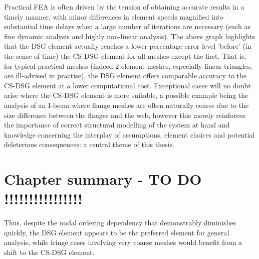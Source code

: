 Practical FEA is often driven by the tension of obtaining accurate results in a timely manner, with minor differences in element speeds magnified into substantial time delays when a large number of iterations are necessary (such as fine dynamic analysis and highly non-linear analysis). The above graph highlights that the DSG element actually reaches a lower percentage error level 'before' (in the sense of time) the CS-DSG element for all meshes except the first. That is, for typical practical meshes (indeed 2 element meshes, especially linear triangles, are ill-advised in practise), the DSG element offers comparable accuracy to the CS-DSG element at a lower computational cost. Exceptional cases will no doubt arise where the CS-DSG element is more suitable, a possible example being the analysis of an I-beam where flange meshes are often naturally coarse due to the size difference between the flanges and the web, however this merely reinforces the importance of correct structural modelling of the system at hand and knowledge concerning the interplay of assumptions, element choices and potential deleterious consequences: a central theme of this thesis.

\section{Chapter summary - TO DO !!!!!!!!!!!!!!!!}

Thus, despite the nodal ordering dependency that demonstrably diminishes quickly, the DSG element appears to be the preferred element for general analysis, while fringe cases involving very coarse meshes would benefit from a shift to the CS-DSG element.
